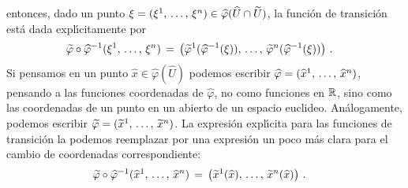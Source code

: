 entonces, dado un punto
$\xi=(\lista*{\xi}{n})\in\widehat{\varphi}(\widehat{U}\cap\widetilde{U})$,
la funci\'{o}n de transici\'{o}n est\'{a} dada expl\'{\i}citamente por
\begin{align*}
	\widetilde{\varphi}\circ\widehat{\varphi}^{-1}(\lista*{\xi}{n}) &
		\,=\,\big(
		\widetilde{\varphi}^{1}(\widehat{\varphi}^{-1}(\xi)),\,\dots,\,
			\widetilde{\varphi}^{n}(\widehat{\varphi}^{-1}(\xi))
			\big)
	\text{ .}
\end{align*}
%
Si pensamos en un punto $\widehat{x}\in\widehat{\varphi}(\widehat{U})$
podemos escribir $\widehat{\varphi}=(\lista*{\widehat{x}}{n})$, pensando
a las funciones coordenadas de $\widehat{\varphi}$, no como funciones en
$\mathbb{R}$, sino como las coordenadas de un punto en un abierto de un
espacio euclideo. An\'{a}logamente, podemos escribir
$\widetilde{\varphi}=(\lista*{\widetilde{x}}{n})$. La expresi\'{o}n
expl\'{\i}cita para las funciones de transici\'{o}n la podemos reemplazar
por una expresi\'{o}n un poco m\'{a}s clara para el cambio de coordenadas
correspondiente:
\begin{align*}
	\widetilde{\varphi}\circ\widehat{\varphi}^{-1}
		(\lista*{\widehat{x}}{n}) & \,=\,\big(
		\widetilde{x}^{1}(\widehat{x}),\,\dots,\,
		\widetilde{x}^{n}(\widehat{x})
		\big)
	\text{ .}
\end{align*}
%

